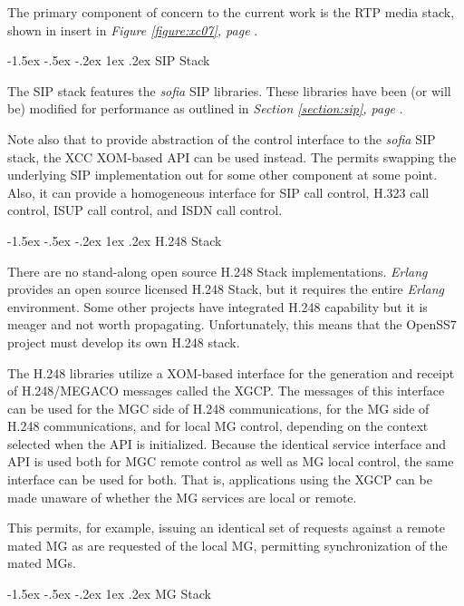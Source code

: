 \documentclass[letterpaper,final,notitlepage,twocolumn,10pt,twoside]{article}
\makeatletter
\let\normalsize = \small
\let\small = \footnotesize
\let\footnotesize = \scriptsize
\let\scriptsize = \tiny
\renewcommand\subsection{\@startsection{subsection}{2}{\z@}%
                                     {-1.5ex \@plus -.5ex \@minus -.2ex}%
                                     {1ex \@plus .2ex}%
                                     {\normalfont\normalsize\bfseries}}
\makeatother
\begin{document}
The primary component of concern to the current work is the RTP media stack,
shown in insert in {\sl Figure \ref{figure:xc07}, page \pageref{figure:xc07}}.

\subsection{SIP Stack}

The SIP stack features the {\sl sofia} SIP libraries.  These libraries have
been (or will be) modified for performance as outlined in {\sl Section
\ref{section:sip}, page \pageref{section:sip}}.

Note also that to provide abstraction of the control interface to the {\sl
sofia} SIP stack, the XCC XOM-based API can be used instead.  The permits
swapping the underlying SIP implementation out for some other component at
some point.  Also, it can provide a homogeneous interface for SIP call
control, H.323 call control, ISUP call control, and ISDN call control.

\subsection{H.248 Stack}

There are no stand-along open source H.248 Stack implementations.  {\sl
Erlang} provides an open source licensed H.248 Stack, but it requires the
entire {\sl Erlang} environment.  Some other projects have integrated H.248
capability but it is meager and not worth propagating.  Unfortunately, this
means that the OpenSS7 project must develop its own H.248 stack.

The H.248 libraries utilize a XOM-based interface for the generation and
receipt of H.248/MEGACO messages called the XGCP.  The messages of this
interface can be used for the MGC side of H.248 communications, for the MG
side of H.248 communications, and for local MG control, depending on the
context selected when the API is initialized.  Because the identical service
interface and API is used both for MGC remote control as well as MG local
control, the same interface can be used for both.  That is, applications using
the XGCP can be made unaware of whether the MG services are local or remote.

This permits, for example, issuing an identical set of requests against a
remote mated MG as are requested of the local MG, permitting synchronization
of the mated MGs.

\subsection{MG Stack}
\end{document}
